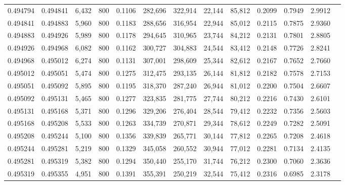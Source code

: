 \begin{tabular}{rrrrrrrrrrrrr}
0.494794 & 0.494841 &  6,432 & 800 &                                     0.1106 & 282,696 & 322,914 &  22,144 &  85,812 & 0.2099 & 0.7949 & 2.9912 \\
0.494841 & 0.494883 &  5,960 & 800 &                                     0.1183 & 288,656 & 316,954 &  22,944 &  85,012 & 0.2115 & 0.7875 & 2.9360 \\
0.494883 & 0.494926 &  5,989 & 800 &                                     0.1178 & 294,645 & 310,965 &  23,744 &  84,212 & 0.2131 & 0.7801 & 2.8805 \\
0.494926 & 0.494968 &  6,082 & 800 &                                     0.1162 & 300,727 & 304,883 &  24,544 &  83,412 & 0.2148 & 0.7726 & 2.8241 \\
0.494968 & 0.495012 &  6,274 & 800 &                                     0.1131 & 307,001 & 298,609 &  25,344 &  82,612 & 0.2167 & 0.7652 & 2.7660 \\
0.495012 & 0.495051 &  5,474 & 800 &                                     0.1275 & 312,475 & 293,135 &  26,144 &  81,812 & 0.2182 & 0.7578 & 2.7153 \\
0.495051 & 0.495092 &  5,895 & 800 &                                     0.1195 & 318,370 & 287,240 &  26,944 &  81,012 & 0.2200 & 0.7504 & 2.6607 \\
0.495092 & 0.495131 &  5,465 & 800 &                                     0.1277 & 323,835 & 281,775 &  27,744 &  80,212 & 0.2216 & 0.7430 & 2.6101 \\
0.495131 & 0.495168 &  5,371 & 800 &                                     0.1296 & 329,206 & 276,404 &  28,544 &  79,412 & 0.2232 & 0.7356 & 2.5603 \\
0.495168 & 0.495208 &  5,533 & 800 &                                     0.1263 & 334,739 & 270,871 &  29,344 &  78,612 & 0.2249 & 0.7282 & 2.5091 \\
0.495208 & 0.495244 &  5,100 & 800 &                                     0.1356 & 339,839 & 265,771 &  30,144 &  77,812 & 0.2265 & 0.7208 & 2.4618 \\
0.495244 & 0.495281 &  5,219 & 800 &                                     0.1329 & 345,058 & 260,552 &  30,944 &  77,012 & 0.2281 & 0.7134 & 2.4135 \\
0.495281 & 0.495319 &  5,382 & 800 &                                     0.1294 & 350,440 & 255,170 &  31,744 &  76,212 & 0.2300 & 0.7060 & 2.3636 \\
0.495319 & 0.495355 &  4,951 & 800 &                                     0.1391 & 355,391 & 250,219 &  32,544 &  75,412 & 0.2316 & 0.6985 & 2.3178 \\

\end{tabular}
